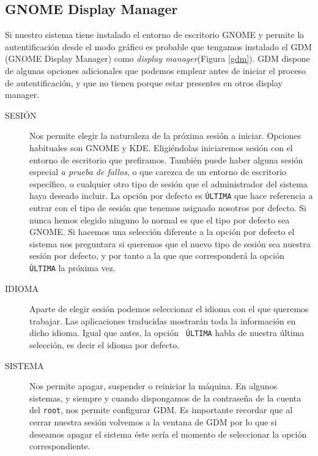 \subsection{GNOME Display Manager}

Si  nuestro sistema  tiene  instalado el  entorno  de escritorio  {\sf
GNOME} y permite la autentificación  desde el modo gráfico es probable
que tengamos instalado el {\sf  GDM (GNOME Display Manager)} como {\em
display  manager}(Figura  \ref{gdm}).  {\sf GDM}  dispone  de  algunas
opciones adicionales que  podemos emplear antes de  iniciar el proceso
de autentificación,  y que no  tienen porque estar presentes  en otros
display manager.

\begin{description}

\item[SESIÓN] Nos permite elegir la  naturaleza de la próxima sesión a
iniciar. Opciones habituales son {\sf GNOME} y {\sf KDE}. Eligiéndolas
iniciaremos  sesión  con  el  entorno de  escritorio  que  prefiramos.
También puede haber alguna sesión especial {\em a prueba de fallos}, o
que carezca de  un entorno de escritorio específico,  o cualquier otro
tipo de sesión que el  administrador del sistema haya deseado incluir.
La opción por defecto es {\tt ÚLTIMA} que hace referencia a entrar con
el tipo de sesión que tenemos  asignado nosotros por defecto. Si nunca
hemos elegido  ninguno lo normal es  que el tipo por  defecto sea {\sf
GNOME}. Si hacemos una selección diferente  a la opción por defecto el
sistema nos  preguntara si queremos  que el  nuevo tipo de  sesión sea
nuestra sesión por defecto, y por  tanto a la que que corresponderá la
opción {\tt ÚLTIMA} la próxima vez.

\item[IDIOMA] Aparte  de elegir  sesión podemos seleccionar  el idioma
con el  que queremos  trabajar. Las aplicaciones  traducidas mostrarán
toda la información  en dicho idioma. Igual que antes,  la opción {\tt
ÚLTIMA}  habla de  nuestra última  selección, es  decir el  idioma por
defecto.

\item[SISTEMA] Nos  permite apagar, suspender o  reiniciar la máquina.
En algunos sistemas,  y siempre y cuando dispongamos  de la contraseña
de la  cuenta del  {\tt root},  nos permite  configurar {\sf  GDM}. Es
importante recordar que al cerrar nuestra sesión volvemos a la ventana
de {\sf GDM}  por lo que si  deseamos apagar el sistema  éste sería el
momento de seleccionar la opción correspondiente.

\end{description}

